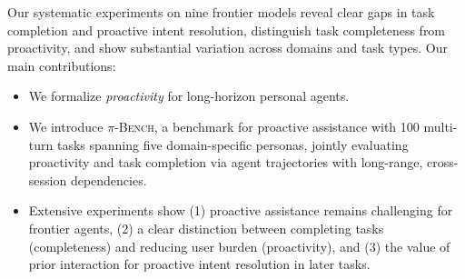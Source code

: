\documentclass{llmxive}
\providecommand{\bench}{\textsc{$\pi$-Bench}}
\begin{document}
Our systematic experiments on nine frontier models reveal clear gaps in task completion and proactive intent resolution, distinguish task completeness from proactivity, and show substantial variation across domains and task types. Our main contributions:
\begin{itemize}[leftmargin=10pt, topsep=0pt, itemsep=1pt, partopsep=1pt, parsep=1pt]
    \item We formalize \emph{proactivity} for long-horizon personal agents.

    \item We introduce {\bench}, a benchmark for proactive assistance with 100 multi-turn tasks spanning five domain-specific personas, jointly evaluating proactivity and task completion via agent trajectories with long-range, cross-session dependencies.



    \item Extensive experiments show (1) proactive assistance remains challenging for frontier agents, (2) a clear distinction between completing tasks (completeness) and reducing user burden (proactivity), and (3) the value of prior interaction for proactive intent resolution in later tasks.
\end{itemize}



\end{document}
